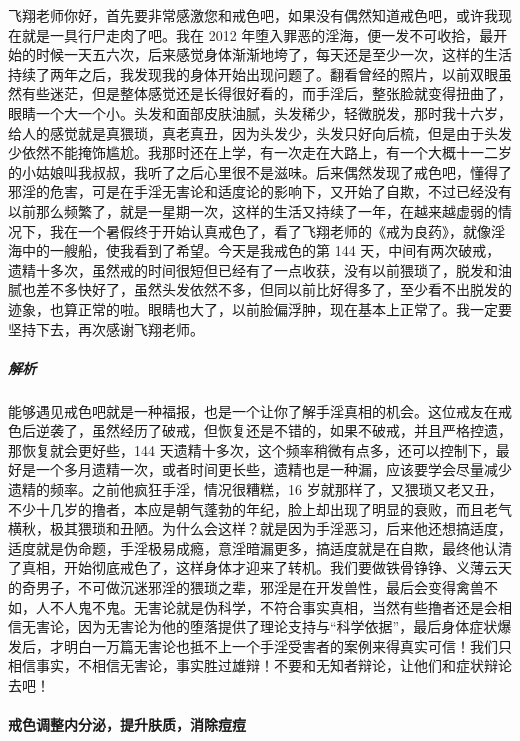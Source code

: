 \begin{case}
    飞翔老师你好，首先要非常感激您和戒色吧，如果没有偶然知道戒色吧，或许我现在就是一具行尸走肉了吧。我在 2012 年堕入罪恶的淫海，便一发不可收拾，最开始的时候一天五六次，后来感觉身体渐渐地垮了，每天还是至少一次，这样的生活持续了两年之后，我发现我的身体开始出现问题了。翻看曾经的照片，以前双眼虽然有些迷茫，但是整体感觉还是长得很好看的，而手淫后，整张脸就变得扭曲了，眼睛一个大一个小。头发和面部皮肤油腻，头发稀少，轻微脱发，那时我十六岁，给人的感觉就是真猥琐，真老真丑，因为头发少，头发只好向后梳，但是由于头发少依然不能掩饰尴尬。我那时还在上学，有一次走在大路上，有一个大概十一二岁的小姑娘叫我叔叔，我听了之后心里很不是滋味。后来偶然发现了戒色吧，懂得了邪淫的危害，可是在手淫无害论和适度论的影响下，又开始了自欺，不过已经没有以前那么频繁了，就是一星期一次，这样的生活又持续了一年，在越来越虚弱的情况下，我在一个暑假终于开始认真戒色了，看了飞翔老师的《戒为良药》，就像淫海中的一艘船，使我看到了希望。今天是我戒色的第 144 天，中间有两次破戒，遗精十多次，虽然戒的时间很短但已经有了一点收获，没有以前猥琐了，脱发和油腻也差不多快好了，虽然头发依然不多，但同以前比好得多了，至少看不出脱发的迹象，也算正常的啦。眼睛也大了，以前脸偏浮肿，现在基本上正常了。我一定要坚持下去，再次感谢飞翔老师。
    \subparagraph{解析} 能够遇见戒色吧就是一种福报，也是一个让你了解手淫真相的机会。这位戒友在戒色后逆袭了，虽然经历了破戒，但恢复还是不错的，如果不破戒，并且严格控遗，那恢复就会更好些，144 天遗精十多次，这个频率稍微有点多，还可以控制下，最好是一个多月遗精一次，或者时间更长些，遗精也是一种漏，应该要学会尽量减少遗精的频率。之前他疯狂手淫，情况很糟糕，16 岁就那样了，又猥琐又老又丑，不少十几岁的撸者，本应是朝气蓬勃的年纪，脸上却出现了明显的衰败，而且老气横秋，极其猥琐和丑陋。为什么会这样？就是因为手淫恶习，后来他还想搞适度，适度就是伪命题，手淫极易成瘾，意淫暗漏更多，搞适度就是在自欺，最终他认清了真相，开始彻底戒色了，这样身体才迎来了转机。我们要做铁骨铮铮、义薄云天的奇男子，不可做沉迷邪淫的猥琐之辈，邪淫是在开发兽性，最后会变得禽兽不如，人不人鬼不鬼。无害论就是伪科学，不符合事实真相，当然有些撸者还是会相信无害论，因为无害论为他的堕落提供了理论支持与“科学依据”，最后身体症状爆发后，才明白一万篇无害论也抵不上一个手淫受害者的案例来得真实可信！我们只相信事实，不相信无害论，事实胜过雄辩！不要和无知者辩论，让他们和症状辩论去吧！
\end{case}

\paragraph{戒色调整内分泌，提升肤质，消除痘痘}

